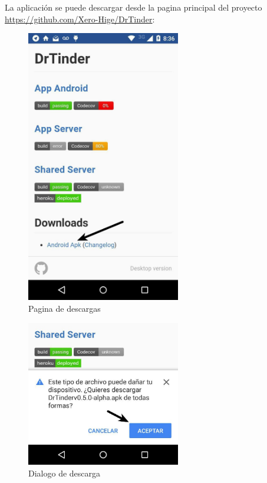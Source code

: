 \documentclass[10pt,letterpaper,extrafontsizes]{memoir}
\begin{document}
La aplicación se puede descargar desde la pagina principal del proyecto \href{https://github.com/Xero-Hige/DrTinder}{https://github.com/Xero-Hige/DrTinder}:\\


\begin{figure}[H]
    \centering
\includegraphics[width=0.6\textwidth]{graficos/capturas/a}
    \caption{Pagina de descargas}
    \label{fig:downloadPage}
\end{figure}

\begin{figure}[H]
    \centering
\includegraphics[width=0.6\textwidth]{graficos/capturas/c}
    \caption{Dialogo de descarga}
    \label{fig:downloaddiag1}
\end{figure}
\end{document}
